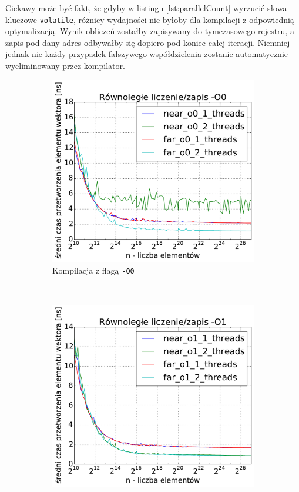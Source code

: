 Ciekawy może być fakt, że gdyby w listingu \ref{lst:parallelCount} wyrzucić słowa kluczowe \texttt{volatile}, różnicy wydajności nie byłoby dla kompilacji z odpowiednią optymalizacją. Wynik obliczeń zostałby zapisywany do tymczasowego rejestru, a zapis pod dany adres odbywałby się dopiero pod koniec całej iteracji. Niemniej jednak nie każdy przypadek fałszywego współdzielenia zostanie automatycznie wyeliminowany przez kompilator.

\begin{figure}
    \centering
    \begin{subfigure}[c]{0.45\textwidth}
        \centering
        \includegraphics[width=\textwidth]{images/benchs/parallel_count_1_2_O0}
        \caption{Kompilacja z flagą \texttt{-O0}}
    \end{subfigure}
    ~
    \begin{subfigure}[c]{0.45\textwidth}
        \centering
        \includegraphics[width=\textwidth]{images/benchs/parallel_count_1_2_O1}

\end{subfigure}
\end{figure}
